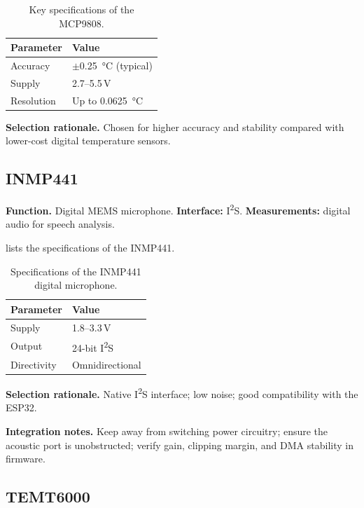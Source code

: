 \begin{table}[H]
\centering
\caption{Key specifications of the MCP9808.}
\label{tab:mcp9808-specs}
\small
\begin{tabularx}{\columnwidth}{@{}l Y@{}}
\toprule
\textbf{Parameter} & \textbf{Value} \\
\midrule
Accuracy & $\pm$\SI{0.25}{\celsius} (typical) \\
Supply & 2.7--5.5\,V \\
Resolution & Up to \SI{0.0625}{\celsius} \\
\bottomrule
\end{tabularx}
\end{table}

\textbf{Selection rationale.} Chosen for higher accuracy and stability compared with lower-cost digital temperature sensors.

\subsection{INMP441}
\label{sec:inmp441}

\textbf{Function.} Digital MEMS microphone. \textbf{Interface:} I\textsuperscript{2}S. \textbf{Measurements:} digital audio for speech analysis.

 lists the specifications of the INMP441.

\begin{table}[H]
\centering
\caption{Specifications of the INMP441 digital microphone.}
\label{tab:inmp441-specs}
\small
\begin{tabularx}{\columnwidth}{@{}l Y@{}}
\toprule
\textbf{Parameter} & \textbf{Value} \\
\midrule
Supply & 1.8--3.3\,V \\
Output & 24-bit I\textsuperscript{2}S \\
Directivity & Omnidirectional \\
\bottomrule
\end{tabularx}
\end{table}

\textbf{Selection rationale.} Native I\textsuperscript{2}S interface; low noise; good compatibility with the ESP32.

\textbf{Integration notes.} Keep away from switching power circuitry; ensure the acoustic port is unobstructed; verify gain, clipping margin, and DMA stability in firmware.

\subsection{TEMT6000}
\label{sec:temt6000}


